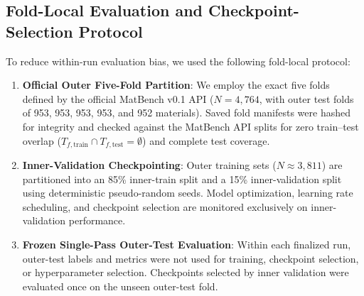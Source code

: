 \documentclass[journal,article,submit,moreauthors,pdftex]{article}
\begin{document}
\subsection{Fold-Local Evaluation and Checkpoint-Selection Protocol}
To reduce within-run evaluation bias, we used the following fold-local protocol:
\begin{enumerate}
    \item \textbf{Official Outer Five-Fold Partition}: We employ the exact five folds defined by the official MatBench v0.1 API ($N = 4{,}764$, with outer test folds of 953, 953, 953, 953, and 952 materials). Saved fold manifests were hashed for integrity and checked against the MatBench API splits for zero train--test overlap ($T_{f,\mathrm{train}} \cap T_{f,\mathrm{test}} = \emptyset$) and complete test coverage.
    \item \textbf{Inner-Validation Checkpointing}: Outer training sets ($N \approx 3,811$) are partitioned into an 85\% inner-train split and a 15\% inner-validation split using deterministic pseudo-random seeds. Model optimization, learning rate scheduling, and checkpoint selection are monitored exclusively on inner-validation performance.
    \item \textbf{Frozen Single-Pass Outer-Test Evaluation}: Within each finalized run, outer-test labels and metrics were not used for training, checkpoint selection, or hyperparameter selection. Checkpoints selected by inner validation were evaluated once on the unseen outer-test fold.
\end{enumerate}
\end{document}
